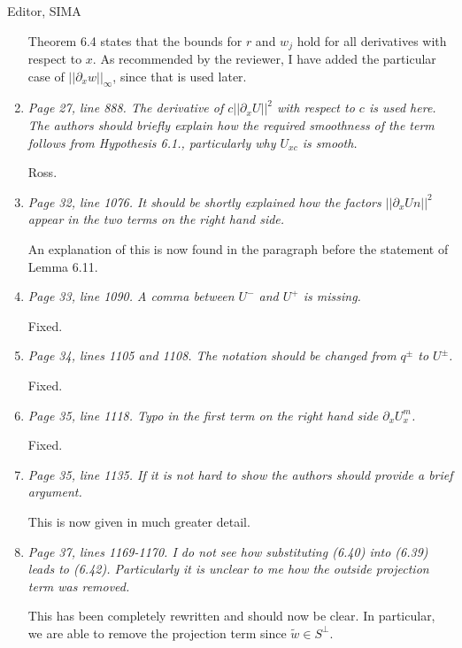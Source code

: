 \documentclass[11pt]{letter}
\begin{document}
\begin{letter}{Editor, SIMA}
\begin{enumerate}
Theorem 6.4 states that the bounds for $r$ and $w_j$ hold for all derivatives with respect to $x$. As recommended by the reviewer, I have added the particular case of $||\partial_x w||_\infty$, since that is used later.

\item \emph{Page 27, line 888. The derivative of $c||\partial_x U||^2$ with respect to $c$ is used here. The authors should briefly explain how the required smoothness of the term follows from Hypothesis 6.1., particularly why $U_{xc}$ is smooth.}
\vspace{4mm}

Ross.

\item \emph{Page 32, line 1076. It should be shortly explained how the factors $||\partial_x Un||^2$ appear in the two terms on the right hand side.}
\vspace{4mm}

An explanation of this is now found in the paragraph before the statement of Lemma 6.11.

\item \emph{Page 33, line 1090. A comma between $U^-$ and $U^+$ is missing.}
\vspace{4mm}

Fixed.

\item \emph{Page 34, lines 1105 and 1108. The notation should be changed from $q^\pm$ to $U^\pm$.}
\vspace{4mm}

Fixed.

\item \emph{Page 35, line 1118. Typo in the first term on the right hand side $\partial_x U_x^m$.}
\vspace{4mm}

Fixed.

\item \emph{Page 35, line 1135. If it is not hard to show the authors should provide a brief argument.}
\vspace{4mm}

This is now given in much greater detail.

\item \emph{Page 37, lines 1169-1170. I do not see how substituting (6.40) into (6.39) leads to (6.42). Particularly it is unclear to me how the outside projection term was removed.}
\vspace{4mm}

This has been completely rewritten and should now be clear. In particular, we are able to remove the projection term since $\tilde{w} \in S^\perp$.


\end{enumerate}
\end{letter}
\end{document}
